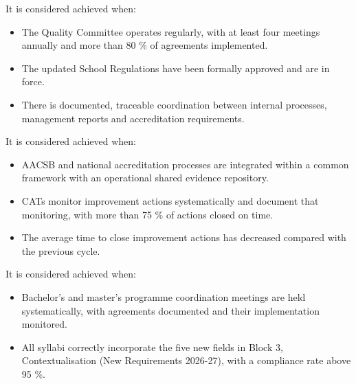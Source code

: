 \documentclass[11pt,a4paper]{scrreprt}
\begin{document}
\begin{tcolorbox}[pabox={gobcolor}{Objective 1. Strategic alignment and School governance}]
\small It is considered achieved when:
\begin{itemize}[noitemsep,topsep=2pt]
\item The Quality Committee operates regularly, with at least four meetings annually and more than 80 \% of agreements implemented.
\item The updated School Regulations have been formally approved and are in force.
\item There is documented, traceable coordination between internal processes, management reports and accreditation requirements.
\end{itemize}
\end{tcolorbox}

\vspace{6pt}

\begin{tcolorbox}[pabox={gobcolor}{Objective 2. Accreditation and quality assurance}]
\small It is considered achieved when:
\begin{itemize}[noitemsep,topsep=2pt]
\item AACSB and national accreditation processes are integrated within a common framework with an operational shared evidence repository.
\item CATs monitor improvement actions systematically and document that monitoring, with more than 75 \% of actions closed on time.
\item The average time to close improvement actions has decreased compared with the previous cycle.
\end{itemize}
\end{tcolorbox}

\vspace{6pt}

\begin{tcolorbox}[pabox={gobcolor}{Objective 3. Teaching coordination and curricular coherence}]
\small It is considered achieved when:
\begin{itemize}[noitemsep,topsep=2pt]
\item Bachelor's and master's programme coordination meetings are held systematically, with agreements documented and their implementation monitored.
\item All syllabi correctly incorporate the five new fields in Block 3, Contextualisation (New Requirements 2026-27), with a compliance rate above 95 \%.
\end{itemize}
\end{tcolorbox}
\end{document}
